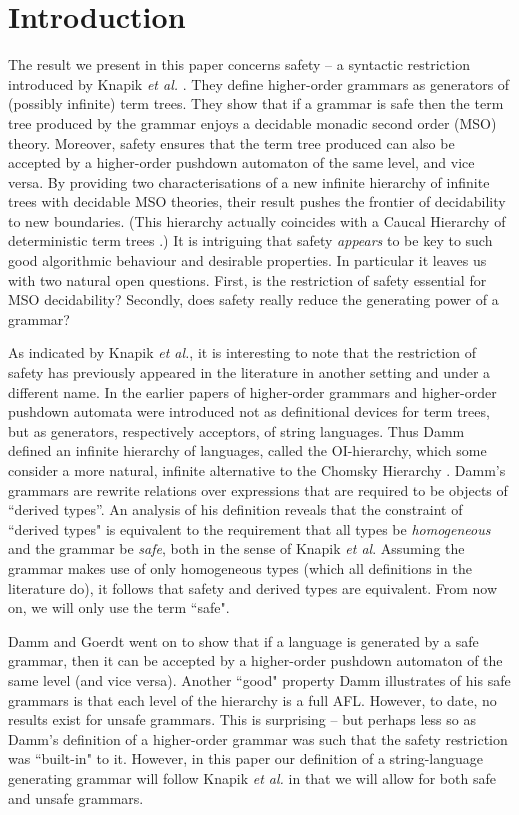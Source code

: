 \section{Introduction}

The result we present in this paper concerns safety -- a
syntactic restriction introduced by Knapik \emph{et al.}
\cite{KNU01, KNU02}.  They define higher-order grammars as
generators of (possibly infinite) term trees. They show
that if a grammar is safe then the term
tree produced by the grammar enjoys a decidable monadic second
order (MSO) theory. Moreover, safety ensures that the term tree produced
can also be accepted by a higher-order pushdown automaton of the
same level, and vice versa. By providing two characterisations of a
new infinite hierarchy of infinite trees with decidable MSO theories,
their result pushes the frontier of decidability to new
boundaries. (This hierarchy actually coincides with a Caucal Hierarchy
of deterministic term trees \cite{Cau02}.) It is intriguing that
safety \emph{appears} to be key to such good algorithmic behaviour and
desirable properties. In particular it leaves us with two natural
open questions. First, is the restriction of safety essential for MSO
decidability? Secondly, does safety really reduce the generating power of a grammar?

As indicated by Knapik \emph{et al.}, it is interesting to note
that the restriction of safety has previously appeared in the
literature in another setting and under a different name. In the
earlier papers of \cite{Dam82, DG86} higher-order grammars and
higher-order pushdown automata were introduced not as definitional
devices for term trees, but as generators, respectively acceptors,
of string languages. Thus Damm defined an infinite hierarchy of languages,
called the OI-hierarchy, which some consider a more natural,
infinite alternative to the Chomsky Hierarchy \cite{Cho59}. Damm's
grammars are rewrite relations over expressions that are required to
be objects of ``derived types''. An analysis of
his definition reveals that the constraint of ``derived types" is
equivalent to the requirement that all types be \emph{homogeneous} and
the grammar be \emph{safe}, both in the sense of Knapik \emph{et al}. Assuming the grammar makes use of only homogeneous types (which all
definitions in the literature do), it follows that safety and
derived types are equivalent. From now on, we will only use the
term ``safe".

Damm and Goerdt went on to show that if a language is generated by a
safe grammar, then it can be accepted by a higher-order pushdown
automaton of the same level (and vice versa). Another
``good" property Damm illustrates of his safe grammars is that
each level of the hierarchy is a full AFL. However, to date, no
results exist for unsafe grammars. This is surprising -- but
perhaps less so as Damm's definition of a higher-order grammar was
such that the safety restriction was ``built-in" to it. However, in
this paper our definition of a string-language generating grammar will
follow Knapik \emph{et al.} in that we will allow for both safe and
unsafe grammars.

